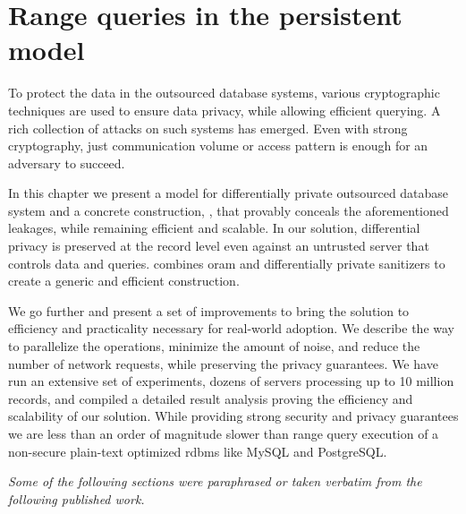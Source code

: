 \chapter{Range queries in the persistent model}\label{section:range-persistent}
\thispagestyle{myheadings}

	To protect the data in the outsourced database systems, various cryptographic techniques are used to ensure data privacy, while allowing efficient querying.
	A rich collection of attacks on such systems has emerged.
	Even with strong cryptography, just communication volume or access pattern is enough for an adversary to succeed.

	In this chapter we present a model for differentially private outsourced database system and a concrete construction, \epsolute{}, that provably conceals the aforementioned leakages, while remaining efficient and scalable.
	In our solution, differential privacy is preserved at the record level even against an untrusted server that controls data and queries.
	\epsolute{} combines \acrlong{oram} and differentially private sanitizers to create a generic and efficient construction.

	We go further and present a set of improvements to bring the solution to efficiency and practicality necessary for real-world adoption.
	We describe the way to parallelize the operations, minimize the amount of noise, and reduce the number of network requests, while preserving the privacy guarantees.
	We have run an extensive set of experiments, dozens of servers processing up to 10 million records, and compiled a detailed result analysis proving the efficiency and scalability of our solution.
	While providing strong security and privacy guarantees we are less than an order of magnitude slower than range query execution of a non-secure plain-text optimized \acrshort{rdbms} like MySQL and PostgreSQL\@.

	\emph{Some of the following sections were paraphrased or taken verbatim from the following published work.}

	\cite{epsolute} 

	
	
	
	
	
	
